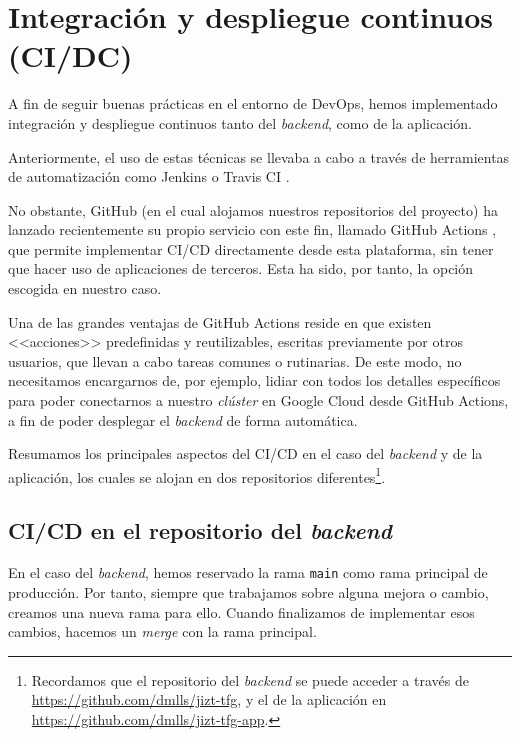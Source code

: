\section{Integración y despliegue continuos (CI/DC)}

A fin de seguir buenas prácticas en el entorno de DevOps, hemos implementado integración y despliegue continuos tanto del \emph{backend}, como de la aplicación.

Anteriormente, el uso de estas técnicas se llevaba a cabo a través de herramientas de automatización como Jenkins \cite{jenkins} o Travis CI \cite{travis}.

No obstante, GitHub (en el cual alojamos nuestros repositorios del proyecto) ha lanzado recientemente su propio servicio con este fin, llamado GitHub Actions \cite{github-actions}, que permite implementar CI/CD directamente desde esta plataforma, sin tener que hacer uso de aplicaciones de terceros. Esta ha sido, por tanto, la opción escogida en nuestro caso.

Una de las grandes ventajas de GitHub Actions reside en que existen <<acciones>> predefinidas y reutilizables, escritas previamente por otros usuarios, que llevan a cabo tareas comunes o rutinarias. De este modo, no necesitamos encargarnos de, por ejemplo, lidiar con todos los detalles específicos para poder conectarnos a nuestro \emph{clúster} en Google Cloud desde GitHub Actions, a fin de poder desplegar el \emph{backend} de forma automática.

Resumamos los principales aspectos del CI/CD en el caso del \emph{backend} y de la aplicación, los cuales se alojan en dos repositorios diferentes\footnote{Recordamos que el repositorio del \emph{backend} se puede acceder a través de \href{https://github.com/dmlls/jizt-tfg}{https://github.com/dmlls/jizt-tfg}, y el de la aplicación en \href{https://github.com/dmlls/jizt-tfg-app}{https://github.com/dmlls/jizt-tfg-app}.}.

\subsection{CI/CD en el repositorio del \emph{backend}}

En el caso del \emph{backend}, hemos reservado la rama \texttt{main} como rama principal de producción. Por tanto, siempre que trabajamos sobre alguna mejora o cambio, creamos una nueva rama para ello. Cuando finalizamos de implementar esos cambios, hacemos un \emph{merge} con la rama principal.

